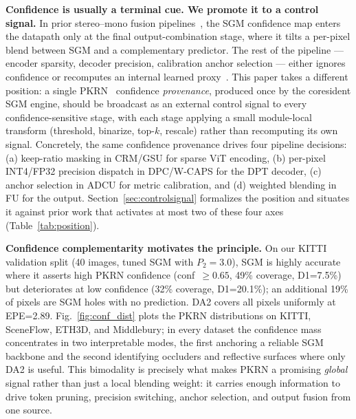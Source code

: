 \documentclass[journal]{IEEEtran}
\begin{document}
\textbf{Confidence is usually a terminal cue. We promote it to a control signal.} In prior stereo--mono fusion pipelines~\cite{facil2019camconvs,wang2019pseudolidar,poggi2016pkrn}, the SGM confidence map enters the datapath only at the final output-combination stage, where it tilts a per-pixel blend between SGM and a complementary predictor. The rest of the pipeline --- encoder sparsity, decoder precision, calibration anchor selection --- either ignores confidence or recomputes an internal learned proxy~\cite{you2023vitcod,wang2021spatten}. This paper takes a different position: a single PKRN~\cite{poggi2016pkrn} confidence \emph{provenance}, produced once by the coresident SGM engine, should be broadcast as an external control signal to every confidence-sensitive stage, with each stage applying a small module-local transform (threshold, binarize, top-$k$, rescale) rather than recomputing its own signal. Concretely, the same confidence provenance drives four pipeline decisions: (a) keep-ratio masking in CRM/GSU for sparse ViT encoding, (b) per-pixel INT4/FP32 precision dispatch in DPC/W-CAPS for the DPT decoder, (c) anchor selection in ADCU for metric calibration, and (d) weighted blending in FU for the output. Section~\ref{sec:controlsignal} formalizes the position and situates it against prior work that activates at most two of these four axes (Table~\ref{tab:position}).

\textbf{Confidence complementarity motivates the principle.} On our KITTI~\cite{menze2015kitti} validation split (40 images, tuned SGM with $P_2{=}3.0$), SGM is highly accurate where it asserts high PKRN confidence (conf~$\geq 0.65$, 49\% coverage, D1=7.5\%) but deteriorates at low confidence (32\% coverage, D1=20.1\%); an additional 19\% of pixels are SGM holes with no prediction. DA2 covers all pixels uniformly at EPE=2.89. Fig.~\ref{fig:conf_dist} plots the PKRN distributions on KITTI, SceneFlow, ETH3D, and Middlebury; in every dataset the confidence mass concentrates in two interpretable modes, the first anchoring a reliable SGM backbone and the second identifying occluders and reflective surfaces where only DA2 is useful. This bimodality is precisely what makes PKRN a promising \emph{global} signal rather than just a local blending weight: it carries enough information to drive token pruning, precision switching, anchor selection, and output fusion from one source.
\end{document}
